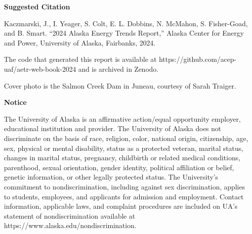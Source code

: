 \newpage

\noindent
{\centering
\bfseries\normalsize Suggested Citation
\par
}

Kaczmarski, J., I. Yeager, S. Colt, E. L. Dobbins, N. McMahon, S. Fisher-Goad, and B. Smart. “2024 Alaska Energy Trends Report,” Alaska Center for Energy and Power, University of Alaska, Fairbanks, 2024.

The code that generated this report is available at https://github.com/acep-uaf/aetr-web-book-2024 and is archived in Zenodo. 

Cover photo is the Salmon Creek Dam in Juneau, courtesy of Sarah Traiger.

\vfill
\noindent
{\centering
\bfseries\normalsize Notice
\par
}
The University of Alaska is an affirmative action/equal opportunity employer, educational institution and provider.  The University of Alaska does not discriminate on the basis of race, religion, color, national origin, citizenship, age, sex, physical or mental disability, status as a protected veteran, marital status, changes in marital status, pregnancy, childbirth or related medical conditions, parenthood, sexual orientation, gender identity, political affiliation or belief, genetic information, or other legally protected status. The University's commitment to nondiscrimination, including against sex discrimination, applies to students, employees, and applicants for admission and employment. Contact information, applicable laws, and complaint procedures are included on UA's statement of nondiscrimination available at https://www.alaska.edu/nondiscrimination.


